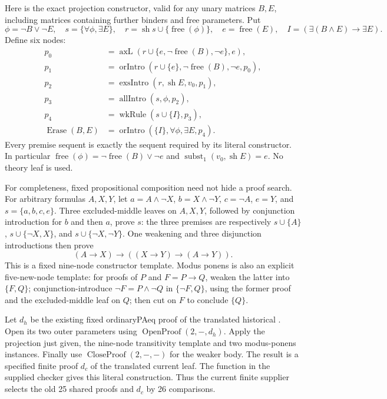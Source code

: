 Here is the exact projection constructor, valid for any unary matrices
$B,E$, including matrices containing further binders and free parameters.
Put
\[
 \phi=\neg B\vee\neg E,\quad
 s=\{\forall\phi,\exists E\},\quad
 r=\operatorname{sh}s\cup\{\operatorname{free}(\phi)\},\quad
 e=\operatorname{free}(E),\quad
 I=(\exists(B\land E)\to\exists E).
\]
Define six nodes:
\begin{align*}
 p_0&=\operatorname{axL}
       (r\cup\{e,\neg\operatorname{free}(B),\neg e\},e),\\
 p_1&=\operatorname{orIntro}
       (r\cup\{e\},\neg\operatorname{free}(B),\neg e,p_0),\\
 p_2&=\operatorname{exsIntro}(r,\operatorname{sh}E,v_0,p_1),\\
 p_3&=\operatorname{allIntro}(s,\phi,p_2),\\
 p_4&=\operatorname{wkRule}(s\cup\{I\},p_3),\\
 \operatorname{Erase}(B,E)&=
       \operatorname{orIntro}(\{I\},\forall\phi,\exists E,p_4).
\end{align*}
Every premise sequent is exactly the sequent required by its literal
constructor.  In particular
$\operatorname{free}(\phi)=
\neg\operatorname{free}(B)\vee\neg e$ and
$\operatorname{subst}_1(v_0,\operatorname{sh}E)=e$.
No theory leaf is used.

For completeness, fixed propositional composition need not hide a proof
search.  For arbitrary formulas $A,X,Y$, let
$a=A\land\neg X$, $b=X\land\neg Y$, $c=\neg A$, $e=Y$,
and $s=\{a,b,c,e\}$.
Three excluded-middle leaves on $A,X,Y$, followed by conjunction
introduction for $b$ and then $a$, prove $s$:
the three premises are respectively $s\cup\{A\}$,
$s\cup\{\neg X,X\}$, and $s\cup\{\neg X,\neg Y\}$.
One weakening and three disjunction introductions then prove
\[
 (A\to X)\to((X\to Y)\to(A\to Y)).
\]
This is a fixed nine-node constructor template.
Modus ponens is also an explicit five-new-node template: for proofs of
$P$ and $F=P\to Q$, weaken the latter into $\{F,Q\}$;
conjunction-introduce $\neg F=P\land\neg Q$ in
$\{\neg F,Q\}$, using the former proof and the excluded-middle
leaf on $Q$; then cut on $F$ to conclude $\{Q\}$.

Let $d_h$ be the existing fixed ordinaryPAeq proof of the translated
historical .  Open its two outer parameters using
$\operatorname{OpenProof}(2,-,d_h)$.  Apply the projection just given,
the nine-node transitivity template and two modus-ponens instances.
Finally use $\operatorname{CloseProof}(2,-,-)$ for the weaker body.
The result is a specified finite proof $d_c$ of the translated current
leaf.  The function  in the supplied
checker gives this literal construction.  Thus the current finite
supplier selects the old 25 shared proofs and $d_c$ by 26 comparisons.

